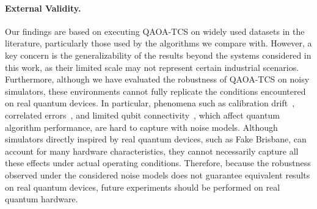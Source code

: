 \paragraph{External Validity.}
Our findings are based on executing \textsc{QAOA-TCS} on widely used datasets in the literature, particularly those used by the algorithms we compare with. However, a key concern is the generalizability of the results beyond the systems considered in this work, as their limited scale may not represent certain industrial scenarios.
Furthermore, although we have evaluated the robustness of \textsc{QAOA-TCS} on noisy simulators, these environments cannot fully replicate the conditions encountered on real quantum devices. In particular, phenomena such as calibration drift~\citep{yeter2023measuring}, correlated errors~\citep{harper2023}, and limited qubit connectivity~\citep{cheng2024}, which affect quantum algorithm performance, are hard to capture with noise models. %
Although simulators directly inspired by real quantum devices, such as Fake Brisbane, can account for many hardware characteristics, they cannot necessarily capture all these effects under actual operating conditions. Therefore, because the robustness observed under the considered noise models does not guarantee equivalent results on real quantum devices, future experiments should be performed on real quantum hardware.


